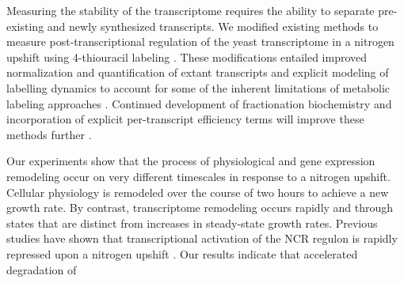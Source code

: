 Measuring the stability of the transcriptome requires the ability to
separate pre-existing and newly synthesized transcripts. We modified
existing methods to measure 
post-transcriptional regulation of the yeast transcriptome in a
nitrogen upshift using 4-thiouracil labeling
\parencite{miller2011dynamic,neymotin2014determination,munchel2011dynamic}. These
modifications entailed improved normalization and quantification of
extant transcripts and explicit modeling of labelling dynamics to
account for some of the inherent limitations of metabolic labeling
approaches \parencite{perez2013eukaryotic}. Continued development of
fractionation biochemistry \parencite{duffy2015tracking} and incorporation of
explicit per-transcript efficiency terms will improve these
methods further \parencite{chan2017non}.

Our experiments show that the process of physiological and gene
expression remodeling occur on very different timescales in response
to a nitrogen upshift. Cellular physiology is remodeled over the
course of two hours to achieve a new growth rate.
By contrast, transcriptome remodeling occurs rapidly and through
states that are distinct
from increases in steady-state growth rates. 
Previous studies have shown that transcriptional activation of the NCR
regulon is rapidly repressed upon a nitrogen upshift
\parencite{airoldi2016steady}. Our
results indicate that accelerated degradation of 
